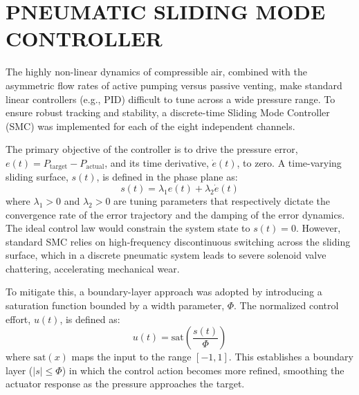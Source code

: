

\section{PNEUMATIC SLIDING MODE CONTROLLER}
\label{sec:inchworm-smc}

The highly non-linear dynamics of compressible air, combined with the
asymmetric flow rates of active pumping versus passive venting, make
standard linear controllers (e.g., PID) difficult to tune across a wide
pressure range. To ensure robust tracking and stability, a discrete-time
Sliding Mode Controller (SMC) was implemented for each of the eight
independent channels.

The primary objective of the controller is to drive the pressure error,
$e(t) = P_{\text{target}} - P_{\text{actual}}$, and its time derivative,
$\dot{e}(t)$, to zero. A time-varying sliding surface, $s(t)$, is defined in
the phase plane as:
\begin{equation}
s(t) = \lambda_1 e(t) + \lambda_2 \dot{e}(t)
\label{eq:inchworm-sliding_surface}
\end{equation}
where $\lambda_1 > 0$ and $\lambda_2 > 0$ are tuning parameters that
respectively dictate the convergence rate of the error trajectory and the
damping of the error dynamics. The ideal control law would constrain the
system state to $s(t) = 0$. However, standard SMC relies on high-frequency
discontinuous switching across the sliding surface, which in a discrete
pneumatic system leads to severe solenoid valve chattering, accelerating
mechanical wear.

To mitigate this, a boundary-layer approach was adopted by introducing a
saturation function bounded by a width parameter, $\Phi$. The normalized
control effort, $u(t)$, is defined as:
\begin{equation}
u(t) = \text{sat}\!\left(\frac{s(t)}{\Phi}\right)
\label{eq:inchworm-control_effort}
\end{equation}
where $\text{sat}(x)$ maps the input to the range $[-1, 1]$. This establishes
a boundary layer ($|s| \le \Phi$) in which the control action becomes more
refined, smoothing the actuator response as the pressure approaches the
target.

